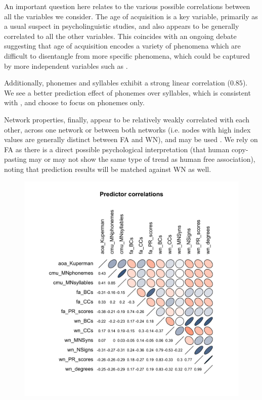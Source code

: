 An important question here relates to the various possible correlations between all the variables we consider.  The age of acquisition is a key variable, primarily as a usual suspect in psycholinguistic studies, and also appears to be generally correlated to all the other variables.  This coincides with an ongoing debate suggesting that age of acquisition encodes a variety of phenomena which are difficult to disentangle from more specific phenomena, which could be captured by more independent variables such as \CN.
 

Additionally, phonemes and syllables exhibit a strong linear correlation ($0.85$).  We see a better prediction effect of phonemes over syllables, which is consistent with \cite{nick-diss}, and choose to focus on phonemes only. 

\bigskip
Network properties, finally, appear to be relatively weakly correlated with each other, across one network or between both networks (i.e. nodes with high index values are generally distinct between FA and WN), and may be used . We rely on FA as there is a direct possible psychological interpretation (that human copy-pasting may or may not show the same type of trend as human free association), noting that prediction results will be matched against WN as well. 

\begin{figure}[!th]
\includegraphics[width=\linewidth]{algorithms/Rplot.pdf}
\end{figure}

